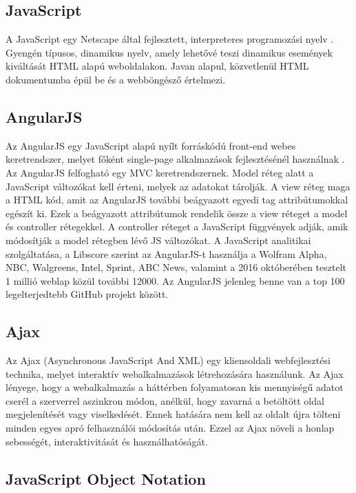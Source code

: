 \subsection{JavaScript}

A JavaScript egy Netscape által fejlesztett, interpreteres programozási nyelv \cite{javascript}. Gyengén típusos, dinamikus nyelv, amely lehetővé teszi dinamikus események kiváltását HTML alapú weboldalakon. Javan alapul, közvetlenül HTML dokumentumba épül be és a webböngésző értelmezi.

\subsection{AngularJS}

Az AngularJS egy JavaScript alapú nyílt forráskódú front-end webes keretrendszer, melyet főként single-page alkalmazások fejlesztésénél használnak \cite{angularjs}. Az AngularJS felfogható egy MVC keretrendszernek. Model réteg alatt a JavaScript változókat kell érteni, melyek az adatokat tárolják. A view réteg maga a HTML kód, amit az AngularJS további beágyazott egyedi tag attribútumokkal egészít ki. Ezek a beágyazott attribútumok rendelik össze a view réteget a model és controller rétegekkel. A controller réteget a JavaScript függvények adják, amik módosítják a model rétegben lévő JS változókat.
A JavaScript analitikai szolgáltatása, a Libscore szerint az AngularJS-t használja a Wolfram Alpha, NBC, Walgreens, Intel, Sprint, ABC News, valamint a 2016 októberében tesztelt 1 millió weblap közül további 12000. Az AngularJS jelenleg benne van a top 100 legelterjedtebb GitHub projekt között.

\subsection{Ajax}

Az Ajax (Asynchronous JavaScript And XML) egy kliensoldali webfejlesztési technika, melyet interaktív webalkalmazások létrehozására használunk. Az Ajax lényege, hogy a webalkalmazás a háttérben folyamatosan kis mennyiségű adatot cserél a szerverrel aszinkron módon, anélkül, hogy zavarná a betöltött oldal megjelenítését vagy viselkedését. Ennek hatására nem kell az oldalt újra tölteni minden egyes apró felhasználói módosítás után. Ezzel az Ajax növeli a honlap sebességét, interaktivitását és használhatóságát.

\subsection{JavaScript Object Notation}

